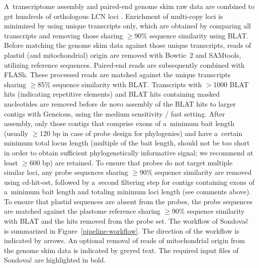 \documentclass[a4paper, 11pt, twoside]{article}
\begin{document}
A~transcriptome assembly and paired-end genome skim raw data are combined to get hundreds of orthologous LCN loci \citep{Schmickl2016}. Enrichment of multi-copy loci is minimized by using unique transcripts only, which are obtained by comparing all transcripts and removing those sharing $\geq$90\% sequence similarity using BLAT. Before matching the genome skim data against those unique transcripts, reads of plastid (and mitochondrial) origin are removed with Bowtie~2 and SAMtools, utilizing reference sequences. Paired-end reads are subsequently combined with FLASh. These processed reads are matched against the unique transcripts sharing $\geq$85\% sequence similarity with BLAT. Transcripts with $>$1000 BLAT hits (indicating repetitive elements) and BLAT hits containing masked nucleotides are removed before de novo assembly of the BLAT hits to larger contigs with Geneious, using the medium sensitivity / fast setting. After assembly, only those contigs that comprise exons of a~minimum bait length (usually $\geq$120 bp in case of probe design for phylogenies) and have a~certain minimum total locus length (multiple of the bait length, should not be too short in order to obtain sufficient phylogenetically informative signal; we recommend at least $\geq$600 bp) are retained. To ensure that probes do not target multiple similar loci, any probe sequences sharing $\geq$90\% sequence similarity are removed using cd-hit-est, followed by a~second filtering step for contigs containing exons of a~minimum bait length and totaling minimum loci length (see comments above). To ensure that plastid sequences are absent from the probes, the probe sequences are matched against the plastome reference sharing $\geq$90\% sequence similarity with BLAT and the hits removed from the probe set. The workflow of Sondovač is summarized in Figure~\ref{pipeline-workflow}. The direction of the workflow is indicated by arrows. An optional removal of reads of mitochondrial origin from the genome skim data is indicated by greyed text. The required input files of Sondovač are highlighted in bold.
\end{document}
